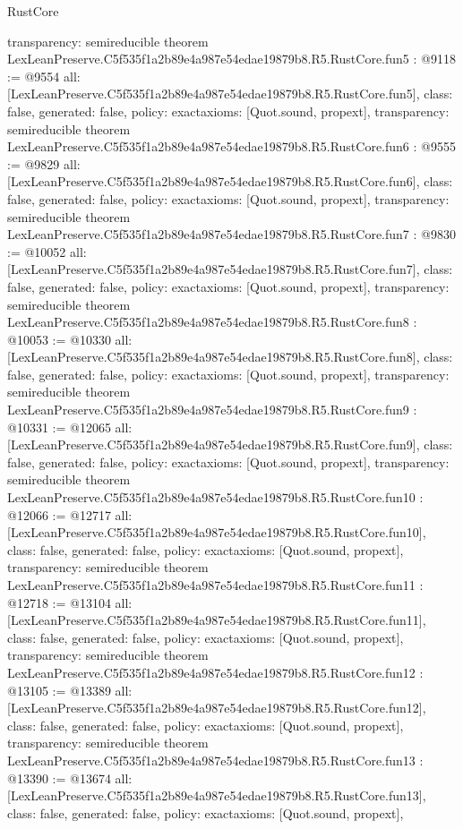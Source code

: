 \begin{lexlean}{RustCore}
\begin{coremodule}
{  transparency: semireducible
}
theorem LexLeanPreserve.C5f535f1a2b89e4a987e54edae19879b8.R5.RustCore.fun5 : @9118 := @9554 {
  all: [LexLeanPreserve.C5f535f1a2b89e4a987e54edae19879b8.R5.RustCore.fun5],
  class: false,
  generated: false,
  policy: exact{axioms: [Quot.sound, propext]},
  transparency: semireducible
}
theorem LexLeanPreserve.C5f535f1a2b89e4a987e54edae19879b8.R5.RustCore.fun6 : @9555 := @9829 {
  all: [LexLeanPreserve.C5f535f1a2b89e4a987e54edae19879b8.R5.RustCore.fun6],
  class: false,
  generated: false,
  policy: exact{axioms: [Quot.sound, propext]},
  transparency: semireducible
}
theorem LexLeanPreserve.C5f535f1a2b89e4a987e54edae19879b8.R5.RustCore.fun7 : @9830 := @10052 {
  all: [LexLeanPreserve.C5f535f1a2b89e4a987e54edae19879b8.R5.RustCore.fun7],
  class: false,
  generated: false,
  policy: exact{axioms: [Quot.sound, propext]},
  transparency: semireducible
}
theorem LexLeanPreserve.C5f535f1a2b89e4a987e54edae19879b8.R5.RustCore.fun8 : @10053 := @10330 {
  all: [LexLeanPreserve.C5f535f1a2b89e4a987e54edae19879b8.R5.RustCore.fun8],
  class: false,
  generated: false,
  policy: exact{axioms: [Quot.sound, propext]},
  transparency: semireducible
}
theorem LexLeanPreserve.C5f535f1a2b89e4a987e54edae19879b8.R5.RustCore.fun9 : @10331 := @12065 {
  all: [LexLeanPreserve.C5f535f1a2b89e4a987e54edae19879b8.R5.RustCore.fun9],
  class: false,
  generated: false,
  policy: exact{axioms: [Quot.sound, propext]},
  transparency: semireducible
}
theorem LexLeanPreserve.C5f535f1a2b89e4a987e54edae19879b8.R5.RustCore.fun10 : @12066 := @12717 {
  all: [LexLeanPreserve.C5f535f1a2b89e4a987e54edae19879b8.R5.RustCore.fun10],
  class: false,
  generated: false,
  policy: exact{axioms: [Quot.sound, propext]},
  transparency: semireducible
}
theorem LexLeanPreserve.C5f535f1a2b89e4a987e54edae19879b8.R5.RustCore.fun11 : @12718 := @13104 {
  all: [LexLeanPreserve.C5f535f1a2b89e4a987e54edae19879b8.R5.RustCore.fun11],
  class: false,
  generated: false,
  policy: exact{axioms: [Quot.sound, propext]},
  transparency: semireducible
}
theorem LexLeanPreserve.C5f535f1a2b89e4a987e54edae19879b8.R5.RustCore.fun12 : @13105 := @13389 {
  all: [LexLeanPreserve.C5f535f1a2b89e4a987e54edae19879b8.R5.RustCore.fun12],
  class: false,
  generated: false,
  policy: exact{axioms: [Quot.sound, propext]},
  transparency: semireducible
}
theorem LexLeanPreserve.C5f535f1a2b89e4a987e54edae19879b8.R5.RustCore.fun13 : @13390 := @13674 {
  all: [LexLeanPreserve.C5f535f1a2b89e4a987e54edae19879b8.R5.RustCore.fun13],
  class: false,
  generated: false,
  policy: exact{axioms: [Quot.sound, propext]},
}
\end{coremodule}
\end{lexlean}
